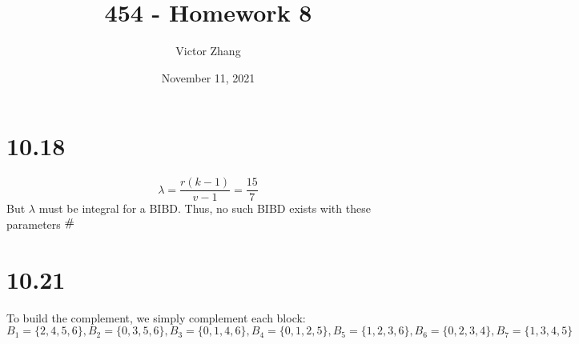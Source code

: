 \documentclass{article}
\title{454 - Homework 8}
\author{Victor Zhang}
\date{November 11, 2021}
\newcommand{\contra}{\raisebox{\depth}{\#}}
\begin{document}
\maketitle

\section*{10.18}
$$\lambda = \frac{r(k-1)}{v-1} = \frac{15}{7}$$
But $\lambda$ must be integral for a BIBD. Thus, no such BIBD exists with these parameters $\contra$

\section*{10.21}
To build the complement, we simply complement each block:
$$B_1 = \{2,4,5,6\}, B_2 = \{0,3,5,6\}, B_3 = \{0,1,4,6\}, B_4 = \{0,1,2,5\}, B_5 = \{1,2,3,6\}, B_6 = \{0,2,3,4\}, B_7 = \{1,3,4,5\}$$
\end{document}
